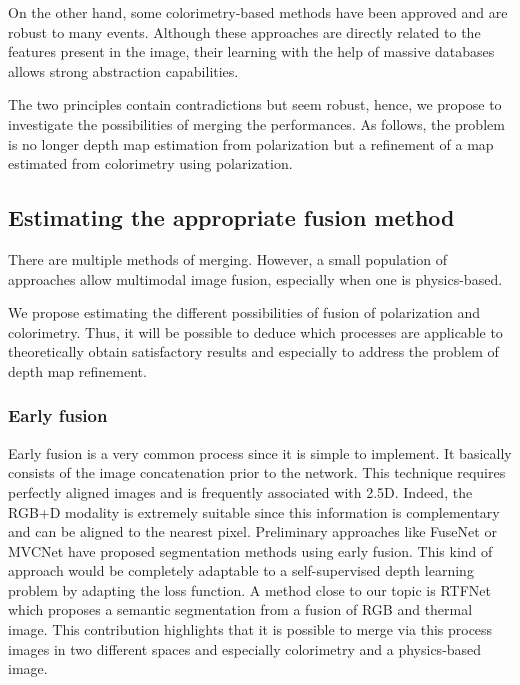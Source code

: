 On the other hand, some colorimetry-based methods have been approved and are robust to many events. Although these approaches are directly related to the features present in the image, their learning with the help of massive databases allows strong abstraction capabilities.

The two principles contain contradictions but seem robust, hence, we propose to investigate the possibilities of merging the performances. As follows, the problem is no longer depth map estimation from polarization but a refinement of a map estimated from colorimetry using polarization.

\subsection{Estimating the appropriate fusion method}

There are multiple methods of merging. However, a small population of approaches allow multimodal image fusion, especially when one is physics-based.

We propose estimating the different possibilities of fusion of polarization and colorimetry. Thus, it will be possible to deduce which processes are applicable to theoretically obtain satisfactory results and especially to address the problem of depth map refinement.

\subsubsection{Early fusion}

Early fusion is a very common process since it is simple to implement. 
It basically consists of the image concatenation prior to the network. This technique requires perfectly aligned images and is frequently associated with 2.5D. Indeed, the RGB+D modality is extremely suitable since this information is complementary and can be aligned to the nearest pixel. 
Preliminary approaches like FuseNet \cite{hazirbas2016fusenet} or MVCNet \cite{ma2017multi} have proposed segmentation methods using early fusion. This kind of approach would be completely adaptable to a self-supervised depth learning problem by adapting the loss function.
A method close to our topic is RTFNet \cite{sun2019rtfnet} which proposes a semantic segmentation from a fusion of RGB and thermal image. This contribution highlights that it is possible to merge via this process images in two different spaces and especially colorimetry and a physics-based image.

